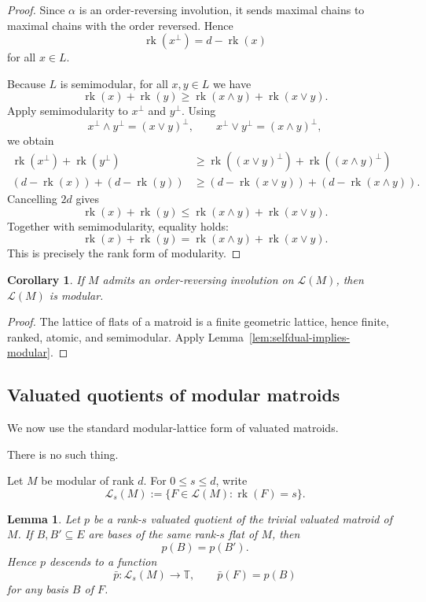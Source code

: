 \documentclass[12pt]{article}
\newcommand{\rk}{\operatorname{rk}}
\newcommand{\cL}{\mathcal L}
\theoremstyle{plain}
\newtheorem{lemma}[theorem]{Lemma}
\newtheorem{corollary}[theorem]{Corollary}
\theoremstyle{definition}
\newcommand{\review}[1]{\begin{reviewbox}#1\end{reviewbox}}
\begin{document}
\begin{proof}
Since \(\alpha\) is an order-reversing involution, it sends maximal chains to maximal chains with the order reversed.  Hence
\[
   \rk(x^\perp)=d-\rk(x)
\]
for all \(x\in L\).

Because \(L\) is semimodular, for all \(x,y\in L\) we have
\[
   \rk(x)+\rk(y)\ge \rk(x\wedge y)+\rk(x\vee y).
\]
Apply semimodularity to \(x^\perp\) and \(y^\perp\).  Using
\[
   x^\perp\wedge y^\perp=(x\vee y)^\perp,
   \qquad
   x^\perp\vee y^\perp=(x\wedge y)^\perp,
\]
we obtain
\[
\begin{aligned}
  \rk(x^\perp)+\rk(y^\perp)
  &\ge
  \rk((x\vee y)^\perp)+\rk((x\wedge y)^\perp)\\
  (d-\rk(x))+(d-\rk(y))
  &\ge
  (d-\rk(x\vee y))+(d-\rk(x\wedge y)).
\end{aligned}
\]
Cancelling \(2d\) gives
\[
   \rk(x)+\rk(y)\le \rk(x\wedge y)+\rk(x\vee y).
\]
Together with semimodularity, equality holds:
\[
   \rk(x)+\rk(y)=\rk(x\wedge y)+\rk(x\vee y).
\]
This is precisely the rank form of modularity.
\end{proof}

\begin{corollary}\label{cor:M-modular}
If \(M\) admits an order-reversing involution on \(\cL(M)\), then \(\cL(M)\) is modular.
\end{corollary}

\begin{proof}
The lattice of flats of a matroid is a finite geometric lattice, hence finite, ranked, atomic, and semimodular.  Apply Lemma~\ref{lem:selfdual-implies-modular}.
\end{proof}

\subsection{Valuated quotients of modular matroids}

We now use the standard modular-lattice form of valuated matroids. \review{There is no such thing.}

Let \(M\) be modular of rank \(d\).  For \(0\le s\le d\), write
\[
   \cL_s(M):=\{F\in \cL(M):\rk(F)=s\}.
\]

\begin{lemma}\label{lem:flat-invariance}
Let \(p\) be a rank-\(s\) valuated quotient of the trivial valuated matroid of \(M\).  If \(B,B'\subseteq E\) are bases of the same rank-\(s\) flat of \(M\), then
\[
   p(B)=p(B').
\]
Hence \(p\) descends to a function
\[
   \bar p:\cL_s(M)\longrightarrow \mathbb T,\qquad
   \bar p(F)=p(B)
\]
for any basis \(B\) of \(F\).
\end{lemma}
\end{document}
